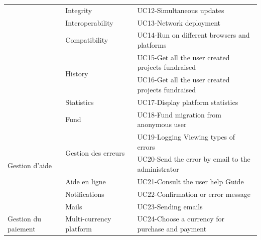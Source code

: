 \begin{longtable}{|m{10em}|m{10em}|m{10em}|}
                                              & \multirow{1}{*}{Integrity}               & UC12-Simultaneous updates                                       \\\cline{2-3}
                                              & \multirow{1}{*}{Interoperability}        & UC13-Network deployment                                         \\\cline{2-3}
                                              & \multirow{1}{*}{Compatibility}           & UC14-Run on different browsers and platforms                    \\\cline{2-3}
                                              & \multirow{2}{*}{History}                 & UC15-Get all the user created projects fundraised               \\\cline{3-3}
                                              &                                          & UC16-Get all the user created projects fundraised               \\\cline{2-3}
                                              & \multirow{1}{*}{Statistics}              & UC17-Display platform statistics                                \\\cline{2-3}
                                              & \multirow{1}{*}{Fund}                    & UC18-Fund migration from anonymous user                         \\\hline
      \multirow{4}{*}{Gestion d’aide}         & \multirow{2}{*}{Gestion des erreurs}     & UC19-Logging Viewing types of errors                            \\\cline{3-3}
                                              &                                          & UC20-Send the error by email to the administrator               \\\cline{2-3}
                                              & \multirow{1}{*}{Aide en ligne}           & UC21-Consult the user help Guide                                \\\cline{2-3}
                                              & \multirow{1}{*}{Notifications}           & UC22-Confirmation or error message                              \\\cline{2-3}
                                              & \multirow{1}{*}{Mails}                   & UC23-Sending emails                                             \\\hline
      \multirow{2}{*}{Gestion du paiement}    & \multirow{1}{*}{Multi-currency platform} & UC24-Choose a currency for purchase and payment                 \\\cline{2-3}

\end{longtable}
